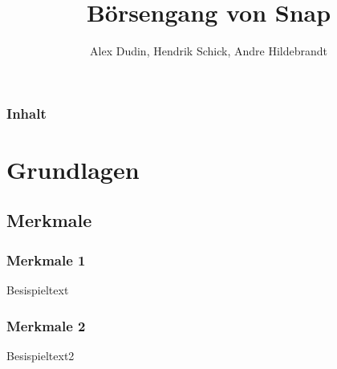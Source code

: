 \documentclass{beamer}
\title{Börsengang von Snap}
\institute{HTWK Leipzig}
\author[]{Alex Dudin, Hendrik Schick, Andre Hildebrandt} %
\begin{document}
\begin{frame}
\titlepage
\end{frame}

\begin{frame}
\frametitle{Inhalt}
\tableofcontents
\end{frame}

\section{Grundlagen}
\subsection{Merkmale}

\begin{frame}
\frametitle{Merkmale 1}

Besispieltext

\end{frame}

\begin{frame}
\frametitle{Merkmale 2}

Besispieltext2

\end{frame}
\end{document}
